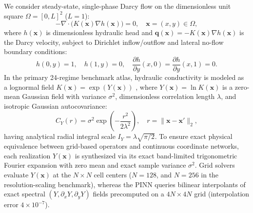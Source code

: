 \documentclass[preprint,12pt,authoryear]{elsarticle}
\begin{document}
We consider steady-state, single-phase Darcy flow on the dimensionless unit square $\Omega = [0, L]^2$ ($L = 1$):
\begin{equation}
  -\nabla \cdot \big(K(\mathbf{x})\nabla h(\mathbf{x})\big) = 0, \quad \mathbf{x} = (x, y) \in \Omega,
  \label{eq:darcy_pde}
\end{equation}
where $h(\mathbf{x})$ is dimensionless hydraulic head and $\mathbf{q}(\mathbf{x}) = -K(\mathbf{x})\nabla h(\mathbf{x})$ is the Darcy velocity, subject to Dirichlet inflow/outflow and lateral no-flow boundary conditions:
\begin{equation}
  h(0, y) = 1, \quad h(1, y) = 0, \quad \frac{\partial h}{\partial y}(x, 0) = \frac{\partial h}{\partial y}(x, 1) = 0.
  \label{eq:bcs}
\end{equation}
In the primary 24-regime benchmark atlas, hydraulic conductivity is modeled as a lognormal field $K(\mathbf{x}) = \exp(Y(\mathbf{x}))$ \citep{dagan1989flow,gelhar1993stochastic,dietrich1993fast}, where $Y(\mathbf{x}) = \ln K(\mathbf{x})$ is a zero-mean Gaussian field with variance $\sigma^2$, dimensionless correlation length $\lambda$, and isotropic Gaussian autocovariance:
\begin{equation}
  C_Y(r) = \sigma^2 \exp\!\left(-\frac{r^2}{2\lambda^2}\right), \quad r = \|\mathbf{x} - \mathbf{x}'\|_2,
  \label{eq:gauss_cov}
\end{equation}
having analytical radial integral scale $I_Y = \lambda\sqrt{\pi/2}$. To ensure exact physical equivalence between grid-based operators and continuous coordinate networks, each realization $Y(\mathbf{x})$ is synthesized via its exact band-limited trigonometric Fourier expansion with zero mean and exact sample variance $\sigma^2$. Grid solvers evaluate $Y(\mathbf{x})$ at the $N \times N$ cell centers ($N = 128$, and $N = 256$ in the resolution-scaling benchmark), whereas the PINN queries bilinear interpolants of exact spectral $(Y, \partial_x Y, \partial_y Y)$ fields precomputed on a $4N \times 4N$ grid (interpolation error $4 \times 10^{-7}$).
\end{document}
